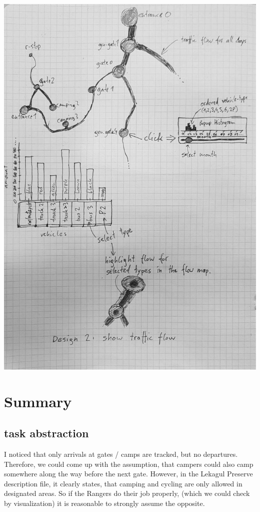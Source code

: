 \documentclass{article}
\begin{document}
\begin{center}
\includegraphics[scale=0.65]{Design2.jpg}	
\end{center}

\section{Summary}
\subsection{task abstraction}
I noticed that only arrivals at gates / camps are tracked, but no departures. Therefore, we could come up with the assumption, that campers could also camp somewhere along the way before the next gate. However, in the Lekagul Preserve description file, it clearly states, that camping and cycling are only allowed in designated areas. So if the Rangers do their job properly, (which we could check by visualization) it is reasonable to strongly assume the opposite.\\
\end{document}
